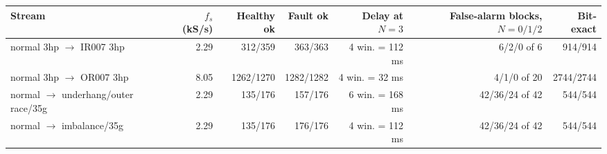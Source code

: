 \begin{tabular}{@{}lrrrrrr@{}}
\toprule
Stream & $f_s$ (kS/s) & Healthy ok & Fault ok & Delay at $N{=}3$ & False-alarm blocks, $N{=}0/1/2$ & Bit-exact \\
\midrule
normal 3hp $\to$ IR007 3hp & 2.29 & 312/359 & 363/363 & 4 win. = 112 ms & 6/2/0 of 6 & 914/914 \\
normal 3hp $\to$ OR007 3hp & 8.05 & 1262/1270 & 1282/1282 & 4 win. = 32 ms & 4/1/0 of 20 & 2744/2744 \\
normal $\to$ underhang/outer race/35g & 2.29 & 135/176 & 157/176 & 6 win. = 168 ms & 42/36/24 of 42 & 544/544 \\
normal $\to$ imbalance/35g & 2.29 & 135/176 & 176/176 & 4 win. = 112 ms & 42/36/24 of 42 & 544/544 \\
\bottomrule
\end{tabular}

